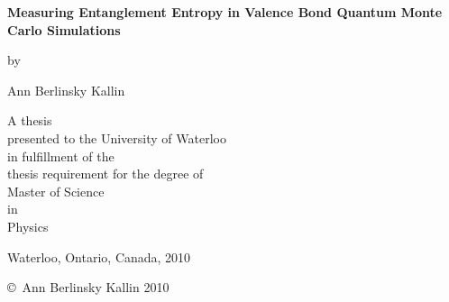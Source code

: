 \pagestyle{empty}

\begin{titlepage}
        \begin{center}
        \vspace*{1.0cm}

        \Huge
        {\bf Measuring Entanglement Entropy in Valence Bond Quantum Monte Carlo Simulations}

        \vspace*{1.0cm}

        \normalsize
        by \\

        \vspace*{1.0cm}

        \Large
        Ann Berlinsky Kallin \\

        \vspace*{3.0cm}

        \normalsize
        A thesis \\
        presented to the University of Waterloo \\ 
        in fulfillment of the \\
        thesis requirement for the degree of \\
        Master of Science \\
        in \\
        Physics \\

        \vspace*{2.0cm}

        Waterloo, Ontario, Canada, 2010 \\

        \vspace*{1.0cm}

        \copyright\ Ann Berlinsky Kallin 2010 \\
        \end{center}
\end{titlepage}

\pagestyle{plain}
\setcounter{page}{2}

